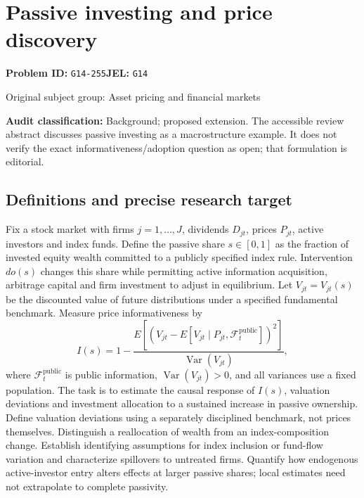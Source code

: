 \documentclass[11pt,a4paper]{article}
\begin{document}
\section*{Passive investing and price discovery}
\textbf{Problem ID:} \texttt{G14-255}\quad \textbf{JEL:} \texttt{G14}\par
\label{problem:OP-0315}
{\sffamily\small\color{muted}Original subject group: Asset pricing and financial markets\par}
\label{definitions:problem:30007597}
\textbf{Audit classification:} Background; proposed extension. The accessible review abstract discusses passive investing as a macrostructure example. It does not verify the exact informativeness/adoption question as open; that formulation is editorial.
\subsection*{Definitions and precise research target}
Fix a stock market with firms \(j=1,\ldots,J\), dividends \(D_{jt}\), prices \(P_{jt}\), active investors and index funds. Define the passive share \(s\in[0,1]\) as the fraction of invested equity wealth committed to a publicly specified index rule. Intervention \(do(s)\) changes this share while permitting active information acquisition, arbitrage capital and firm investment to adjust in equilibrium. Let \(V_{jt}=V_{jt}(s)\) be the discounted value of future distributions under a specified fundamental benchmark. Measure price informativeness by
\[I(s)=1-\frac{E[(V_{jt}-E[V_{jt}\mid P_{jt},\mathcal F_t^{\mathrm{public}}])^2]}{\operatorname{Var}(V_{jt})},\]
where \(\mathcal F_t^{\mathrm{public}}\) is public information, \(\operatorname{Var}(V_{jt})>0\), and all variances use a fixed population. The task is to estimate the causal response of \(I(s)\), valuation deviations and investment allocation to a sustained increase in passive ownership. Define valuation deviations using a separately disciplined benchmark, not prices themselves. Distinguish a reallocation of wealth from an index-composition change. Establish identifying assumptions for index inclusion or fund-flow variation and characterize spillovers to untreated firms. Quantify how endogenous active-investor entry alters effects at larger passive shares; local estimates need not extrapolate to complete passivity.
\end{document}
